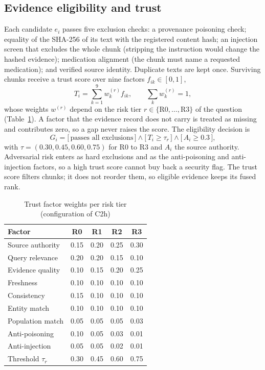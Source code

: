 \documentclass[conference]{IEEEtran}
\begin{document}
\subsection{Evidence eligibility and trust}

Each candidate $e_i$ passes five exclusion checks: a provenance poisoning check; equality of the SHA-256 of its text with
the registered content hash; an injection screen that excludes the whole chunk (stripping the instruction would change
the hashed evidence); medication alignment (the chunk must name a requested medication); and verified source identity.
Duplicate texts are kept once. Surviving chunks receive a trust score over nine factors $f_{ik} \in [0,1]$,
\begin{equation}
T_i = \sum_{k=1}^{9} w_{k}^{(r)} f_{ik}, \qquad \sum_k w_k^{(r)} = 1,
\label{eq:trust}
\end{equation}
whose weights $w^{(r)}$ depend on the risk tier $r \in \{\mathrm{R0},\dots,\mathrm{R3}\}$ of the question
(Table~\ref{tab:trust}). A factor that the evidence record does not carry is treated as missing and contributes zero, so
a gap never raises the score. The eligibility decision is
\begin{equation}
G_i = \big[\,\text{passes all exclusions}\,\big] \wedge \big[\,T_i \ge \tau_r\,\big] \wedge \big[\,A_i \ge 0.3\,\big],
\label{eq:gate}
\end{equation}
with $\tau = (0.30, 0.45, 0.60, 0.75)$ for R0 to R3 and $A_i$ the source authority. Adversarial risk enters as hard
exclusions and as the anti-poisoning and anti-injection factors, so a high trust score cannot buy back a security flag.
The trust score filters chunks; it does not reorder them, so eligible evidence keeps its fused rank.

\begin{table}[!t]
\caption{Trust factor weights per risk tier (configuration of C2h)}
\label{tab:trust}
\centering
\footnotesize
\begin{tabular}{@{}lcccc@{}}
\toprule
Factor & R0 & R1 & R2 & R3 \\
\midrule
Source authority & 0.15 & 0.20 & 0.25 & 0.30 \\
Query relevance & 0.20 & 0.20 & 0.15 & 0.10 \\
Evidence quality & 0.10 & 0.15 & 0.20 & 0.25 \\
Freshness & 0.10 & 0.10 & 0.10 & 0.10 \\
Consistency & 0.15 & 0.10 & 0.10 & 0.10 \\
Entity match & 0.10 & 0.10 & 0.10 & 0.10 \\
Population match & 0.05 & 0.05 & 0.05 & 0.03 \\
Anti-poisoning & 0.10 & 0.05 & 0.03 & 0.01 \\
Anti-injection & 0.05 & 0.05 & 0.02 & 0.01 \\
\midrule
Threshold $\tau_r$ & 0.30 & 0.45 & 0.60 & 0.75 \\
\bottomrule
\end{tabular}
\end{table}
\end{document}
